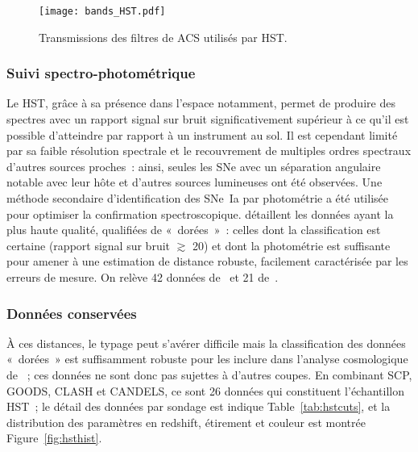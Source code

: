 \documentclass[../main/main.tex]{subfiles}
\begin{document}
\begin{figure}[!ht]
    \centering
    \texttt{[image: bands\_HST.pdf]}
    \captionsetup{justification=centering}
    \caption{Transmissions des filtres de ACS utilisés par HST.}
    \label{fig:hstbands}
\end{figure}

\subsubsection{Suivi spectro-photométrique}\label{sssec:hstspectro}

Le HST, grâce à sa présence dans l'espace notamment, permet de produire des
spectres avec un rapport signal sur bruit significativement supérieur à ce qu'il
est possible d'atteindre par rapport à un instrument au sol. Il est cependant
limité par sa faible résolution spectrale et le recouvrement de multiples ordres
spectraux d'autres sources proches~: ainsi, seules les SNe avec un séparation
angulaire notable avec leur hôte et d'autres sources lumineuses ont été
observées. Une méthode secondaire d'identification des SNe~Ia par photométrie a
été utilisée pour optimiser la confirmation spectroscopique. \cite{riess2007}
détaillent les données ayant la plus haute qualité, qualifiées de «~dorées~»~:
celles dont la classification est certaine (rapport signal sur bruit $\gtrsim$
20) et dont la photométrie est suffisante pour amener à une estimation de
distance robuste, facilement caractérisée par les erreurs de mesure. On relève
42 données de~\cite{strolger2004} et 21 de~\cite{riess2007}.

\subsubsection{Données conservées}\label{sssec:hstdata}

À ces distances, le typage peut s'avérer difficile mais la classification des
données «~dorées~» est suffisamment robuste pour les inclure dans l'analyse
cosmologique de \citep{scolnic2018}~; ces données ne sont donc pas sujettes à
d'autres coupes. En combinant SCP, GOODS, CLASH et CANDELS, ce sont 26 données
qui constituent l'échantillon HST~; le détail des données par sondage est
indique Table~\ref{tab:hstcuts}, et la distribution des paramètres en redshift,
étirement et couleur est montrée Figure~\ref{fig:hsthist}.
\end{document}
